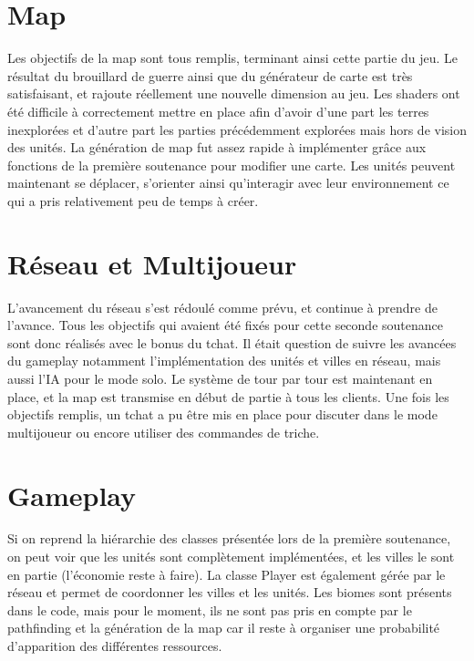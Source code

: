 \documentclass[12pt]{report}
\begin{document}
\section*{Map}

Les objectifs de la map sont tous remplis, terminant ainsi cette partie du jeu.
Le résultat du brouillard de guerre ainsi que du générateur de carte est très
satisfaisant, et rajoute réellement une nouvelle dimension au jeu. Les shaders
ont été difficile à correctement mettre en place afin d'avoir d'une part les
terres inexplorées et d'autre part les parties précédemment explorées mais hors
de vision des unités. La génération de map fut assez rapide à implémenter grâce
aux fonctions de la première soutenance pour modifier une carte. Les unités
peuvent maintenant se déplacer, s'orienter ainsi qu'interagir avec leur
environnement ce qui a pris relativement peu de temps à créer.

\section*{Réseau et Multijoueur}

L’avancement du réseau s'est rédoulé comme prévu, et continue à prendre de
l'avance. Tous les objectifs qui avaient été fixés pour cette seconde
soutenance sont donc réalisés avec le bonus du tchat. Il était question de
suivre les avancées du gameplay notamment l'implémentation des unités et villes
en réseau, mais aussi l'IA pour le mode solo. Le système de tour par tour est
maintenant en place, et la map est transmise en début de partie à tous les
clients. Une fois les objectifs remplis, un tchat a pu être mis en place pour
discuter dans le mode multijoueur ou encore utiliser des commandes de triche.

\section*{Gameplay}

Si on reprend la hiérarchie des classes présentée lors de la première
soutenance, on peut voir que les unités sont complètement implémentées, et les
villes le sont en partie (l’économie reste à faire). La classe Player est
également gérée par le réseau et permet de coordonner les villes et les unités.
Les biomes sont présents dans le code, mais pour le moment, ils ne sont pas
pris en compte par le pathfinding et la génération de la map car il reste à
organiser une probabilité d’apparition des différentes ressources.
\end{document}
